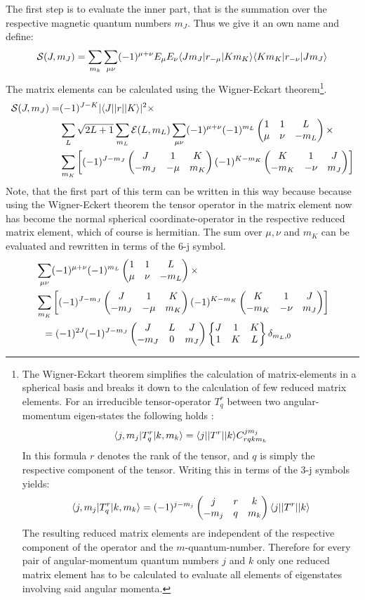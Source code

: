 The first step is to evaluate the inner part, that is the summation over the respective magnetic quantum numbers $m_J$. Thus we give it an own name and define:
\begin{equation}
\mathcal{S}(J,m_J)=\sum_{m_k}\sum_{\mu\nu}(-1)^{\mu+\nu}E_\mu E_\nu\langle Jm_J| r_{-\mu} | Km_K\rangle\langle Km_K| r_{-\nu} | Jm_J\rangle\label{sum}
\end{equation}
The matrix elements can be calculated using the Wigner-Eckart theorem\footnote{The Wigner-Eckart theorem simplifies the calculation of matrix-elements in a spherical basis and breaks it down to the calculation of few reduced matrix elements. For an irreducible tensor-operator $T^r_q$ between two angular-momentum eigen-states the following holds \cite[17]{wigner}:
\begin{equation}
\langle j,m_j| T^r_q | k,m_k\rangle=\langle j| |T^r| | k\rangle C^{jm_j}_{rqkm_k}
\end{equation}
In this formula $r$ denotes the rank of the tensor, and $q$ is simply the respective component of the tensor. Writing this in terms of the 3-j symbols yields:
\begin{equation}
\langle j,m_j| T^r_q | k,m_k\rangle=(-1)^{j-m_j}\begin{pmatrix}j&r&k\\-m_j&q&m_k\end{pmatrix}\langle j| |T^r| | k\rangle
\end{equation}
The resulting reduced matrix elements are independent of the respective component of the operator and the $m$-quantum-number. Therefore for every pair of angular-momentum quantum numbers $j$ and $k$ only one reduced matrix element has to be calculated to evaluate all elements of eigenstates involving said angular momenta.}.
\begin{align}
\mathcal{S}(J,m_J)=&(-1)^{J-K}|\langle J| |r| | K\rangle|^2\times\notag\\&\sum_L\sqrt{2L+1}\sum_{m_L}\mathcal{E}(L,m_L)\sum_{\mu\nu}(-1)^{\mu+\nu}(-1)^{m_L}\begin{pmatrix}1&1&L\\\mu&\nu&-m_L\end{pmatrix}\times\notag\\&\sum_{m_K}\left[(-1)^{J-m_J}\begin{pmatrix}J&1&K\\-m_J&-\mu&m_K\end{pmatrix}(-1)^{K-m_K}\begin{pmatrix}K&1&J\\-m_K&-\nu&m_J\end{pmatrix}\right]\label{sum2}
\end{align}
Note, that the first part of this term can be written in this way because because using the Wigner-Eckert theorem the tensor operator in the matrix element now has become the normal spherical coordinate-operator in the respective reduced matrix element, which of course is hermitian. The sum over $\mu,\nu$ and $m_K$ can be evaluated and rewritten in terms of the 6-j symbol.
\begin{align}
&\sum_{\mu\nu}(-1)^{\mu+\nu}(-1)^{m_L}\threej{1}{1}{L}{\mu}{\nu}{-m_L}\times\notag\\&\sum_{m_K}\left[(-1)^{J-m_J}\threej{J}{1}{K}{-m_J}{-\mu}{m_K}(-1)^{K-m_K}\threej{K}{1}{J}{-m_K}{-\nu}{m_J}\right]\notag\\&\ \ =(-1)^{2J}(-1)^{J-m_J}\threej{J}{L}{J}{-m_J}{0}{m_J}\sixj{J}{1}{K}{1}{K}{L}\delta_{m_L,0}
\end{align}
